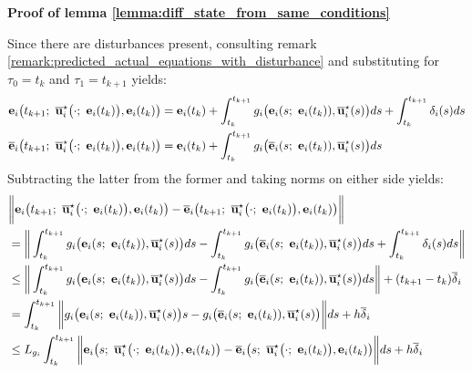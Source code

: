 \begin{gg_box}
\textbf{Proof of lemma \eqref{lemma:diff_state_from_same_conditions}}

Since there are disturbances present, consulting remark
\eqref{remark:predicted_actual_equations_with_disturbance} and substituting
for $\tau_0 = t_k$ and $\tau_1 = t_{k+1}$ yields:
\begin{align}
  \vect{e}_i\big(t_{k+1};\ \overline{\vect{u}}_i^{\star}\big(\cdot;\ \vect{e}_i(t_k)\big), \vect{e}_i(t_k)\big) &=
    \vect{e}_i(t_k)
    + \int_{t_k}^{t_{k+1}} g_i\big(\vect{e}_i(s;\ \vect{e}_i(t_k)), \overline{\vect{u}}_i^{\star}(s)\big) ds
    + \int_{t_k}^{t_{k+1}}\delta_i(s)ds\\
  \overline{\vect{e}}_i\big(t_{k+1};\ \overline{\vect{u}}_i^{\star}\big(\cdot;\ \vect{e}_i(t_k)\big), \vect{e}_i(t_k)\big) &=
    \vect{e}_i(t_k) + \int_{t_k}^{t_{k+1}} g_i\big(\overline{\vect{e}}_i(s;\ \vect{e}_i(t_k)), \overline{\vect{u}}_i^{\star}(s)\big) ds
\end{align}
Subtracting the latter from the former and taking norms on either side yields:
\begin{align}
  &\bigg\| \vect{e}_i\big(t_{k+1};\ \overline{\vect{u}}_i^{\star}\big(\cdot;\ \vect{e}_i(t_k)\big), \vect{e}_i(t_k)\big) -
  \overline{\vect{e}}_i\big(t_{k+1};\ \overline{\vect{u}}_i^{\star}\big(\cdot;\ \vect{e}_i(t_k)\big), \vect{e}_i(t_k)\big) \bigg\| \\
  &=\bigg\| \int_{t_k}^{t_{k+1}} g_i\big(\vect{e}_i(s;\ \vect{e}_i(t_k)), \overline{\vect{u}}_i^{\star}(s)\big) ds
     - \int_{t_k}^{t_{k+1}} g_i\big(\overline{\vect{e}}_i(s;\ \vect{e}_i(t_k)), \overline{\vect{u}}_i^{\star}(s)\big) ds
    + \int_{t_k}^{t_{k+1}}\delta_i(s)ds \bigg\| \\
  & \leq \bigg\| \int_{t_k}^{t_{k+1}} g_i\big(\vect{e}_i(s;\ \vect{e}_i(t_k)), \overline{\vect{u}}_i^{\star}(s)\big) ds
     - \int_{t_k}^{t_{k+1}} g_i\big(\overline{\vect{e}}_i(s;\ \vect{e}_i(t_k)), \overline{\vect{u}}_i^{\star}(s)\big) ds \bigg\|
     + (t_{k+1} - t_k)\overline{\delta}_i \\
  &=
     \int_{t_k}^{t_{k+1}} \bigg\| g_i\big(\vect{e}_i(s;\ \vect{e}_i(t_k)), \overline{\vect{u}}_i^{\star}(s)\big)s
     - g_i\big(\overline{\vect{e}}_i(s;\ \vect{e}_i(t_k)), \overline{\vect{u}}_i^{\star}(s)\big) \bigg\| ds + h \overline{\delta}_i\\
  &\leq L_{g_i} \int_{t_k}^{t_{k+1}} \bigg\| \vect{e}_i\big(s;\ \overline{\vect{u}}_i^{\star}\big(\cdot;\ \vect{e}_i(t_k)\big), \vect{e}_i(t_k)\big) -
  \overline{\vect{e}}_i\big(s;\ \overline{\vect{u}}_i^{\star}\big(\cdot;\ \vect{e}_i(t_k)\big), \vect{e}_i(t_k)\big) \bigg\| ds + h \overline{\delta}_i  \\

\end{align}
\end{gg_box}
